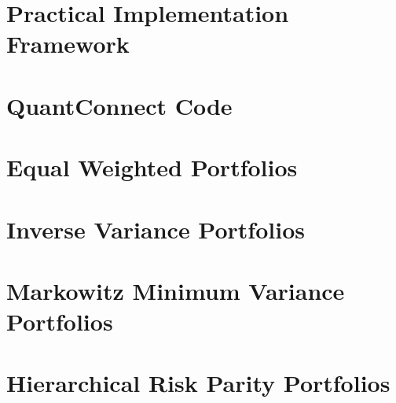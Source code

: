 \documentclass[a4paper,11pt,abstracton,oneside,titlepage,openany,nochapterprefix,noappendixprefix,liststotoc,bibtotoc,normalheadings,pointlessnumbers,BCOR1cm]{article}
\begin{document}
\newpage
\pagestyle{empty}


\newpage
\pagestyle{plain}
\begin{appendices}
    \section{Practical Implementation Framework}\label{appendix:PracticalImplementationFramework}
    
    \newpage
    
    \section{QuantConnect Code}\label{appendix:QuantConnectCode}
    
    \newpage
    
    \section{Equal Weighted Portfolios}\label{appendix:EWPortfolios}
    
    \newpage
    
    \section{Inverse Variance Portfolios}\label{appendix:IVPortfolios}
    
    \newpage
    
    \section{Markowitz Minimum Variance Portfolios}\label{appendix:MMVPortfolios}
    
    \newpage
    
    \section{Hierarchical Risk Parity Portfolios}\label{appendix:HRPPortfolios}
    
    \newpage
    
\end{appendices}

\end{document}
